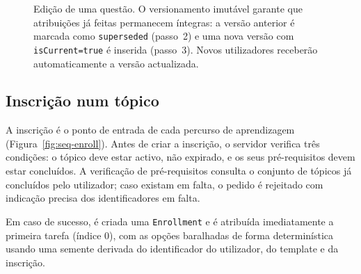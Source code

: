 \begin{figure}[H]
	\caption[Sequ\^encia de edi\c{c}\~ao de uma quest\~ao de t\'opico]{Edi\c{c}\~ao de uma quest\~ao. O versionamento imut\'avel garante que atribui\c{c}\~oes j\'a feitas permanecem \'integras: a vers\~ao anterior \'e marcada como \texttt{superseded} (passo~2) e uma nova vers\~ao com \texttt{isCurrent=true} \'e inserida (passo~3). Novos utilizadores receber\~ao automaticamente a vers\~ao actualizada.}
	\label{fig:seq-edit-task}
\end{figure}

\subsection{Inscri\c{c}\~ao num t\'opico}
\label{ssec:seq-enroll}

A inscri\c{c}\~ao \'e o ponto de entrada de cada percurso de aprendizagem
(Figura~\ref{fig:seq-enroll}). Antes de criar a inscri\c{c}\~ao, o servidor
verifica tr\^es condi\c{c}\~oes: o t\'opico deve estar activo, n\~ao expirado,
e os seus pr\'e-requisitos devem estar conclu\'idos. A verifica\c{c}\~ao de
pr\'e-requisitos consulta o conjunto de t\'opicos j\'a conclu\'idos pelo
utilizador; caso existam em falta, o pedido \'e rejeitado com indica\c{c}\~ao
precisa dos identificadores em falta.

Em caso de sucesso, \'e criada uma \texttt{Enrollment} e \'e atribu\'ida
imediatamente a primeira tarefa (\'indice 0), com as op\c{c}\~oes baralhadas
de forma determin\'istica usando uma semente derivada do identificador do
utilizador, do template e da inscri\c{c}\~ao.

